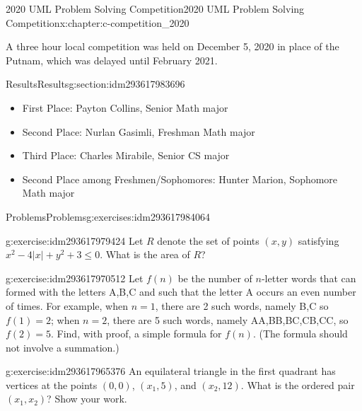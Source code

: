 \documentclass[twoside,10pt,]{book}
\numberwithin{equation}{section}
\begin{document}
\begin{chapterptx}{2020 UML Problem Solving Competition}{}{2020 UML Problem Solving Competition}{}{}{x:chapter:c-competition_2020}
\begin{introduction}{}%
A three hour local competition was held on December 5, 2020 in place of the Putnam, which was delayed until February 2021.%
\end{introduction}%
%
%
\typeout{************************************************}
\typeout{************************************************}
%
\begin{sectionptx}{Results}{}{Results}{}{}{g:section:idm293617983696}
%
\begin{itemize}[label=\textbullet]
\item{}First Place:  Payton Collins, Senior Math major%
\item{}Second Place: Nurlan Gasimli, Freshman Math major%
\item{}Third Place: Charles Mirabile, Senior CS major%
\item{}Second Place among Freshmen\slash{}Sophomores:  Hunter Marion, Sophomore Math major%
\end{itemize}
%
\end{sectionptx}
%
%
\typeout{************************************************}
\typeout{************************************************}
%
\begin{exercises-section}{Problems}{}{Problems}{}{}{g:exercises:idm293617984064}
\begin{divisionexercise}{1}{}{}{g:exercise:idm293617979424}%
Let \(R\) denote the set of points \((x, y)\) satisfying \(x^2 - 4 \lvert x \rvert +y^2 + 3 \leq 0\). What is the area of \(R\)?%
\end{divisionexercise}%
\begin{divisionexercise}{2}{}{}{g:exercise:idm293617970512}%
Let \(f(n)\) be the number of \(n\)-letter words that can formed with the letters A,B,C and such that the letter A occurs an even number of times. For example, when \(n = 1\), there are 2 such words, namely B,C so \(f (1) = 2\); when \(n = 2\), there are 5 such words, namely AA,BB,BC,CB,CC, so \(f(2) = 5\). Find, with proof, a simple formula for \(f(n)\). (The formula should not involve a summation.)%
\end{divisionexercise}%
\begin{divisionexercise}{3}{}{}{g:exercise:idm293617965376}%
An equilateral triangle in the first quadrant has vertices at the points \((0, 0)\), \((x_1, 5)\), and \((x_2, 12)\). What is the ordered pair \((x_1, x_2)\)?  Show your work.%

\end{divisionexercise}
\end{exercises-section}
\end{chapterptx}
\end{document}
